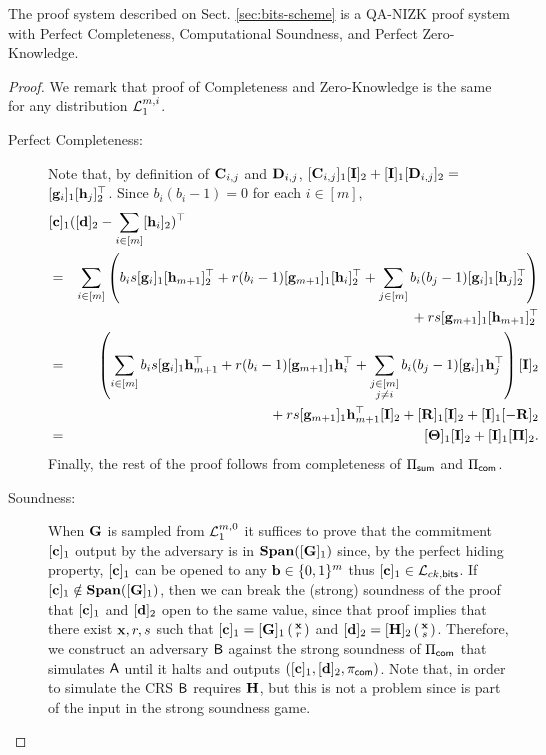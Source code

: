 \begin{theorem} \label{theo:bits}
The proof system described on Sect. \ref{sec:bits-scheme} is a QA-NIZK proof system with Perfect Completeness, Computational Soundness, and Perfect Zero-Knowledge.
\end{theorem}	
\begin{proof}
We remark that proof of Completeness and Zero-Knowledge is the same for any distribution $\mathcal{L}_1^{m,i}$.
\begin{description}
\item[Perfect Completeness:]
Note that,
by definition of $\mathbf{{C}}_{i,j}$ and $\mathbf{{D}}_{i,j}$, 
$[\mathbf{{C}}_{i,j}]_1[\mathbf{{I}}]_2+[\mathbf{{I}}]_1[\mathbf{{D}}_{i,j}]_2=$
$[\mathbf{g}_{i}]_1[\mathbf{h}_j]_2^\top$.  Since $b_i(b_i-1) = 0$ for each $i\in[m]$,
\begin{eqnarray*}
\lefteqn{
[\vecb{c}]_1( [\vecb{d}]_2 - \sum_{i\in[m]} [\vecb{h}_{i}]_2)^\top}\\
& = & 
    \sum_{i \in [m]}\left(
        b_i s[\vecb{g}_{i}]_1[\vecb{h}_{m+1}]_2^{\top}+
        r(b_i-1)[\vecb{g}_{m+1}]_1[\vecb{h}_i]_2^{\top}+
        \sum_{j \in [m]} b_i (b_j-1)[\vecb{g}_{i}]_1[\vecb{h}_{j}]_2^{\top}
    \right)
\\ & & \mbox{ }
    + rs[\vecb{g}_{m+1}]_1[\vecb{h}_{m+1}]_2^{\top}\\
& = & 
    \left(\sum_{i\in[m]}b_is[\vecb{g}_{i}]_1\vecb{h}_{m+1}^{\top}+r(b_i-1)[\vecb{g}_{m+1}]_1\vecb{h}_i^{\top}+
        \sum_{\substack{j \in [m]\\j\neq i}}b_i(b_j-1)[\vecb{g}_{i}]_1\vecb{h}_{j}^{\top}\right)[\matr{I}]_2\\
& & \mbox{ }
    +rs[\vecb{g}_{m+1}]_1\vecb{h}_{m+1}^{\top}[\matr{I}]_2
    +[\matr{R}]_1[\matr{I}]_2 + [\matr{I}]_1[-\matr{R}]_2
\\ & = &
    [\matr{\Theta}]_1[\matr{I}]_2+
    [\matr{I}]_1[\matr{\Pi}]_2.
\end{eqnarray*}
Finally, the rest of the proof follows from completeness of $\Pi_{\mathsf{sum}}$ and $\Pi_{\mathsf{com}}$. 

\item[Soundness:] When $\mathbf{{G}}$ is sampled from $\mathcal{L}_1^{m,0}$ it suffices to prove that the commitment $[\mathbf{c}]_1$ output by the adversary is in $\mathbf{Span}([\mathbf{{G}}]_1)$ since, by the perfect hiding property, $[\mathbf{c}]_1$ can be opened to any $\mathbf{b}\in\{0,1\}^m$ thus $[\mathbf{c}]_1\in\mathcal{L}_{ck,\mathsf{bits}}$. If $[\mathbf{c}]_1\notin\mathbf{Span}([\mathbf{{G}}]_1)$, then we can break the (strong) soundness of the proof that $[\mathbf{c}]_1$ and $[\mathbf{d}]_2$ open to the same value, since that proof implies that there exist $\mathbf{x},r,s$ such that $[\mathbf{c}]_1=[\mathbf{{G}}]_1\left(\begin{smallmatrix}\mathbf{x}\\r\end{smallmatrix}\right)$ and $[\mathbf{d}]_2=[\mathbf{{H}}]_2\left(\begin{smallmatrix}\mathbf{x}\\s\end{smallmatrix}\right)$. Therefore, we construct an adversary $\mathsf{B}$ against the strong soundness of $\Pi_{\mathsf{com}}$ that simulates $\mathsf{A}$ until it halts and outputs $([\mathbf{c}]_1,[\mathbf{d}]_2,\pi_{\mathsf{com}})$. Note that, in order to simulate the CRS $\mathsf{B}$ requires $\mathbf{{H}}$, but this is not a problem since is part of the input in the strong soundness game.
 

\end{description}
\end{proof}
